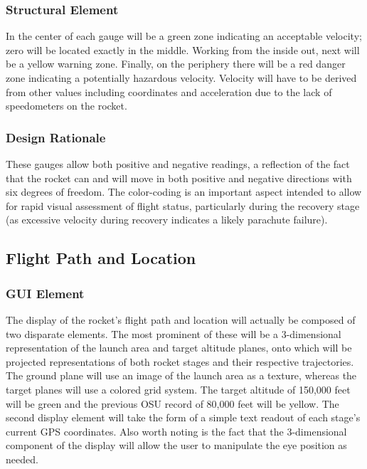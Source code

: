 \documentclass[journal,10pt,onecolumn,compsoc]{IEEEtran}
\begin{document}
		\subsubsection{Structural Element}
			In the center of each gauge will be a green zone indicating an acceptable velocity; zero will be located exactly in the middle.
			Working from the inside out, next will be a yellow warning zone.
			Finally, on the periphery there will be a red danger zone indicating a potentially hazardous velocity.
			Velocity will have to be derived from other values including coordinates and acceleration due to the lack of speedometers on the rocket.
			
		\subsubsection{Design Rationale}
			These gauges allow both positive and negative readings, a reflection of the fact that the rocket can and will move in both positive and negative directions with six degrees of freedom.
			The color-coding is an important aspect intended to allow for rapid visual assessment of flight status, particularly during the recovery stage (as excessive velocity during recovery indicates a likely parachute failure).

	\subsection{Flight Path and Location}

		\subsubsection{GUI Element}
			The display of the rocket's flight path and location will actually be composed of two disparate elements.
			The most prominent of these will be a 3-dimensional representation of the launch area and target altitude planes, onto which will be projected representations of both rocket stages and their respective trajectories.
			The ground plane will use an image of the launch area as a texture, whereas the target planes will use a colored grid system.
			The target altitude of 150,000 feet will be green and the previous OSU record of 80,000 feet will be yellow.
			The second display element will take the form of a simple text readout of each stage's current GPS coordinates.
			Also worth noting is the fact that the 3-dimensional component of the display will allow the user to manipulate the eye position as needed.
			
\end{document}
